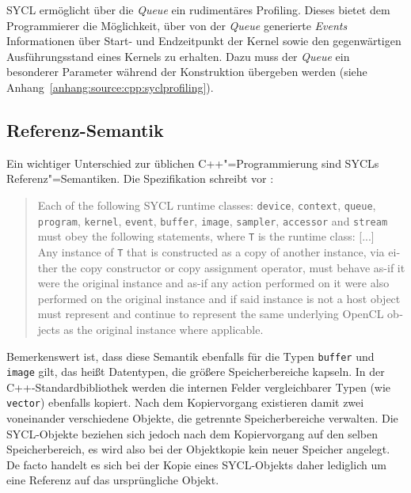 SYCL ermöglicht über die \textit{Queue} ein rudimentäres Profiling. Dieses
bietet dem Programmierer die Möglichkeit, über von der \textit{Queue} generierte
\textit{Events} Informationen über Start- und Endzeitpunkt der Kernel sowie den
gegenwärtigen Ausführungsstand eines Kernels zu erhalten. Dazu muss der
\textit{Queue} ein besonderer Parameter während der Konstruktion übergeben
werden (siehe Anhang~\ref{anhang:source:cpp:syclprofiling}).

\subsection{Referenz-Semantik}

Ein wichtiger Unterschied zur üblichen C++"=Programmierung sind SYCLs
Referenz"=Semantiken. Die Spezifikation schreibt vor
\cite[siehe][Abschnitt 4.3.2]{sycl2019}:
\begin{otherlanguage}{english}
    \begin{quote}
        Each of the following SYCL runtime classes: \texttt{device},
        \texttt{context}, \texttt{queue}, \texttt{program}, \texttt{kernel},
        \texttt{event}, \texttt{buffer}, \texttt{image}, \texttt{sampler},
        \texttt{accessor} and \texttt{stream} must obey the following
        statements, where \texttt{T} is the runtime class: [...]
        \\
        Any instance of \texttt{T} that is constructed as a copy of another
        instance, via either the copy constructor or copy assignment operator,
        must behave as-if it were the original instance and as-if any action
        performed on it were also performed on the original instance and if said
        instance is not a host object must represent and continue to represent
        the same underlying OpenCL objects as the original instance where
        applicable.
    \end{quote}
\end{otherlanguage}
Bemerkenswert ist, dass diese Semantik ebenfalls für die Typen \texttt{buffer}
und \texttt{image} gilt, das heißt Datentypen, die größere Speicherbereiche
kapseln. In der C++-Standardbibliothek werden die internen Felder vergleichbarer
Typen (wie \texttt{vector}) ebenfalls kopiert. Nach dem Kopiervorgang existieren
damit zwei voneinander verschiedene Objekte, die getrennte Speicherbereiche
verwalten. Die SYCL-Objekte beziehen sich jedoch nach dem Kopiervorgang auf den
selben Speicherbereich, es wird also bei der Objektkopie kein neuer Speicher
angelegt. De facto handelt es sich bei der Kopie eines SYCL-Objekts daher
lediglich um eine Referenz auf das ursprüngliche Objekt.

